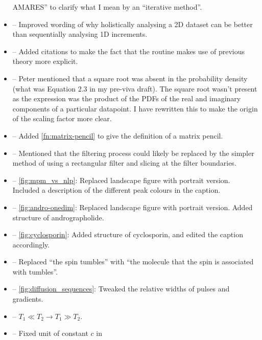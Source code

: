\documentclass[12pt]{article}
\begin{document}
\begin{itemize}
            AMARES'' to clarify what I mean by an ``iterative method''.
        \item {} -- Improved wording of why holistically
            analysing a 2D dataset can be better than sequentially analysing 1D
            increments.
        \item {} -- Added citations to make the fact
            that the routine makes use of previous theory more explicit.
        \item {} -- Peter mentioned that a square
            root was absent in the probability density (what was Equation 2.3
            in my pre-viva draft). The square root wasn't present as the
            expression was the product of the PDFs of the real and imaginary
            components of a particular datapoint. I have rewritten this to make
            the origin of the scaling factor more clear.
        \item {} -- Added \cref{fn:matrix-pencil} to
            give the definition of a matrix pencil.
        \item {} -- Mentioned that the filtering
            process could likely be replaced by the simpler method of using a
            rectangular filter and slicing at the filter boundaries.
        \item {} -- \cref{fig:mpm_vs_nlp}: Replaced
            landscape figure with portrait version. Included a description of the
            different peak colours in the caption.
        \item {} -- \cref{fig:andro-onedim}: Replaced
            landscape figure with portrait version. Added structure of andrographolide.
        \item {} -- \cref{fig:cyclosporin}: Added structure of
            cyclosporin, and edited the caption accordingly.
        \item {} -- Replaced ``the spin tumbles''
            with ``the molecule that the spin is associated with tumbles''.
        \item {} -- \cref{fig:diffusion_sequences}:
            Tweaked the relative widths of pulses and gradients.
       \item {} -- $T_1 \ll T_2 \rightarrow T_1 \gg T_2$.
        \item {} -- Fixed unit of constant $c$ in

\end{itemize}
\end{document}
